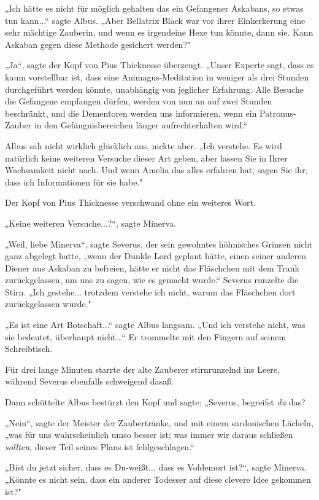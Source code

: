 {„Ich hätte es nicht für möglich gehalten das ein Gefangener Askabans, so etwas tun kann...“ sagte Albus. „Aber Bellatrix Black war vor ihrer Einkerkerung eine sehr mächtige Zauberin, und wenn es irgendeine Hexe tun könnte, dann sie. Kann Askaban gegen diese Methode gesichert werden?"

„Ja“, sagte der Kopf von Pius Thicknesse überzeugt. „Unser Experte sagt, dass es kaum vorstellbar ist, dass eine Animagus-Meditation in weniger als drei Stunden durchgeführt werden könnte, unabhängig von jeglicher Erfahrung. Alle Besuche die Gefangene empfangen dürfen, werden von nun an auf zwei Stunden beschränkt, und die Dementoren werden uns informieren, wenn ein Patronus-Zauber in den Gefängnisbereichen länger aufrechterhalten wird.“

Albus sah nicht wirklich glücklich aus, nickte aber. „Ich verstehe. Es wird natürlich keine weiteren Versuche dieser Art geben, aber lassen Sie in Ihrer Wachsamkeit nicht nach. Und wenn Amelia das alles erfahren hat, sagen Sie ihr, dass ich Informationen für sie habe."

Der Kopf von Pius Thicknesse verschwand ohne ein weiteres Wort.

„Keine weiteren Versuche...?“, sagte Minerva.

„Weil, liebe Minerva“, sagte Severus, der sein gewohntes höhnisches Grinsen nicht ganz abgelegt hatte, „wenn der Dunkle Lord geplant hätte, einen seiner anderen Diener aus Askaban zu befreien, hätte er nicht das Fläschchen mit dem Trank zurückgelassen, um uns zu sagen, wie es gemacht wurde.“ Severus runzelte die Stirn. „Ich gestehe... trotzdem verstehe ich nicht, warum das Fläschchen dort zurückgelassen wurde."

„Es ist eine Art Botschaft...“ sagte Albus langsam. „Und ich verstehe nicht, was sie bedeutet, überhaupt nicht...“ Er trommelte mit den Fingern auf seinem Schreibtisch.

Für drei lange Minuten starrte der alte Zauberer stirnrunzelnd ins Leere, während Severus ebenfalls schweigend dasaß.

Dann schüttelte Albus bestürzt den Kopf und sagte: „Severus, begreifst \emph{du} das?

„Nein“, sagte der Meister der Zaubertränke, und mit einem sardonischen Lächeln, „was für uns wahrscheinlich umso besser ist; was immer wir daraus schließen \emph{sollten}, dieser Teil seines Plans ist fehlgeschlagen.“

„Bist du jetzt sicher, dass es Du-weißt... dass es Voldemort ist?“, sagte Minerva. „Könnte es nicht sein, dass ein anderer Todesser auf diese clevere Idee gekommen ist?"

}
